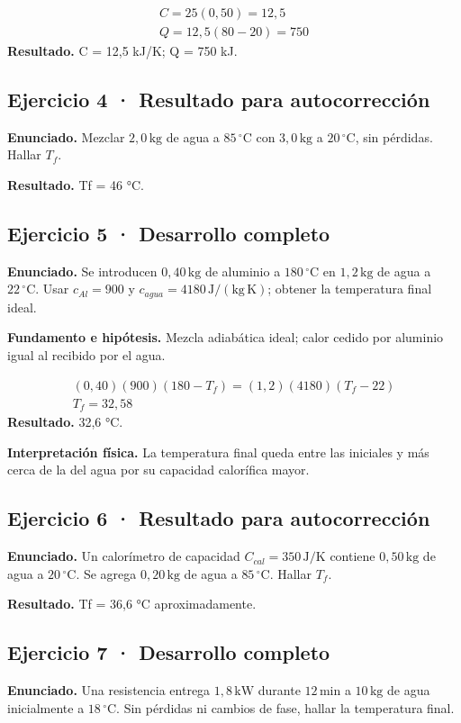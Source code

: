 \documentclass[11pt,a4paper]{article}
\begin{document}
\[
\begin{gathered}
C=25(0{,}50)=12{,}5\\Q=12{,}5(80-20)=750
\end{gathered}
\]
\textbf{Resultado.} C = 12,5 kJ/K; Q = 750 kJ.


\subsection*{Ejercicio 4 · Resultado para autocorrección}
\textbf{Enunciado.} Mezclar \(2{,}0\,\mathrm{kg}\) de agua a \(85\,^\circ\mathrm C\) con \(3{,}0\,\mathrm{kg}\) a \(20\,^\circ\mathrm C\), sin pérdidas. Hallar \(T_f\).

\textbf{Resultado.} Tf = 46 °C.


\subsection*{Ejercicio 5 · Desarrollo completo}
\textbf{Enunciado.} Se introducen \(0{,}40\,\mathrm{kg}\) de aluminio a \(180\,^\circ\mathrm C\) en \(1{,}2\,\mathrm{kg}\) de agua a \(22\,^\circ\mathrm C\). Usar \(c_{Al}=900\) y \(c_{agua}=4180\,\mathrm{J/(kg\,K)}\); obtener la temperatura final ideal.

\textbf{Fundamento e hipótesis.} Mezcla adiabática ideal; calor cedido por aluminio igual al recibido por el agua.

\[
\begin{gathered}
(0{,}40)(900)(180-T_f)=(1{,}2)(4180)(T_f-22)\\T_f=32{,}58
\end{gathered}
\]
\textbf{Resultado.} 32,6 °C.

\textbf{Interpretación física.} La temperatura final queda entre las iniciales y más cerca de la del agua por su capacidad calorífica mayor.


\subsection*{Ejercicio 6 · Resultado para autocorrección}
\textbf{Enunciado.} Un calorímetro de capacidad \(C_{cal}=350\,\mathrm{J/K}\) contiene \(0{,}50\,\mathrm{kg}\) de agua a \(20\,^\circ\mathrm C\). Se agrega \(0{,}20\,\mathrm{kg}\) de agua a \(85\,^\circ\mathrm C\). Hallar \(T_f\).

\textbf{Resultado.} Tf = 36,6 °C aproximadamente.


\subsection*{Ejercicio 7 · Desarrollo completo}
\textbf{Enunciado.} Una resistencia entrega \(1{,}8\,\mathrm{kW}\) durante \(12\,\mathrm{min}\) a \(10\,\mathrm{kg}\) de agua inicialmente a \(18\,^\circ\mathrm C\). Sin pérdidas ni cambios de fase, hallar la temperatura final.
\end{document}
